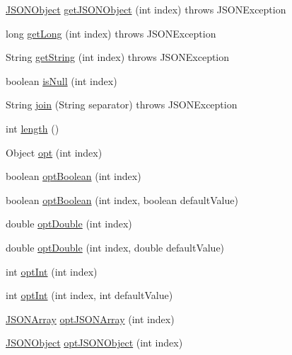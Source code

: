 \begin{DoxyCompactItemize}
\item 
\hyperlink{classorg_1_1json_1_1_j_s_o_n_object}{J\-S\-O\-N\-Object} \hyperlink{classorg_1_1json_1_1_j_s_o_n_array_a7f3e6fc64826daba30f40964cd92e57e}{get\-J\-S\-O\-N\-Object} (int index)  throws J\-S\-O\-N\-Exception 
\item 
long \hyperlink{classorg_1_1json_1_1_j_s_o_n_array_a7d8cb28bbbcc4d3a3b00700a12331b94}{get\-Long} (int index)  throws J\-S\-O\-N\-Exception 
\item 
String \hyperlink{classorg_1_1json_1_1_j_s_o_n_array_a3b52ac3d94f48cdddf503e7872653591}{get\-String} (int index)  throws J\-S\-O\-N\-Exception 
\item 
boolean \hyperlink{classorg_1_1json_1_1_j_s_o_n_array_a53362530300e3530297eb8ddaf74098d}{is\-Null} (int index)
\item 
String \hyperlink{classorg_1_1json_1_1_j_s_o_n_array_ad0fbfe8fea05cdf7f06ddfe20db7c8c6}{join} (String separator)  throws J\-S\-O\-N\-Exception 
\item 
int \hyperlink{classorg_1_1json_1_1_j_s_o_n_array_a8382a78090007f650a02895ecbf3c8ec}{length} ()
\item 
Object \hyperlink{classorg_1_1json_1_1_j_s_o_n_array_a19aa83c80cded3d0a252c212ceca7954}{opt} (int index)
\item 
boolean \hyperlink{classorg_1_1json_1_1_j_s_o_n_array_a157f9232dea069ba4d201d1eba431084}{opt\-Boolean} (int index)
\item 
boolean \hyperlink{classorg_1_1json_1_1_j_s_o_n_array_adf119f56ddd47c4b9703f44efac4c3ef}{opt\-Boolean} (int index, boolean default\-Value)
\item 
double \hyperlink{classorg_1_1json_1_1_j_s_o_n_array_ae1cb586b1d073252a0ac07b6965f7a08}{opt\-Double} (int index)
\item 
double \hyperlink{classorg_1_1json_1_1_j_s_o_n_array_a0e12afede9c6e7be4ca467ce48171d17}{opt\-Double} (int index, double default\-Value)
\item 
int \hyperlink{classorg_1_1json_1_1_j_s_o_n_array_a10c76bdd9ef243702d62c0c92ea803fc}{opt\-Int} (int index)
\item 
int \hyperlink{classorg_1_1json_1_1_j_s_o_n_array_a820390cf8f7846a2363c59119e303a2d}{opt\-Int} (int index, int default\-Value)
\item 
\hyperlink{classorg_1_1json_1_1_j_s_o_n_array}{J\-S\-O\-N\-Array} \hyperlink{classorg_1_1json_1_1_j_s_o_n_array_af73e0318cfde76d4ade3cfc1bb99e325}{opt\-J\-S\-O\-N\-Array} (int index)
\item 
\hyperlink{classorg_1_1json_1_1_j_s_o_n_object}{J\-S\-O\-N\-Object} \hyperlink{classorg_1_1json_1_1_j_s_o_n_array_a21bcc36e0e4ce0f4659497db27d7081d}{opt\-J\-S\-O\-N\-Object} (int index)

\end{DoxyCompactItemize}
